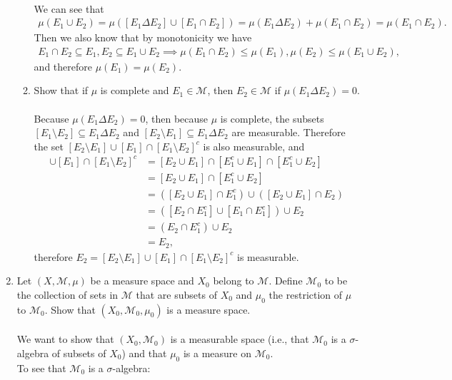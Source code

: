 \begin{enumerate}
\begin{enumerate}[label=(\roman*),align=left]
		\\We can see that
		\begin{align*}
			\mu(E_1\cup E_2)=\mu([E_1\Delta E_2]\cup[E_1\cap E_2])=\mu(E_1\Delta E_2)+\mu(E_1\cap E_2)=\mu(E_1\cap E_2).
		\end{align*}
		Then we also know that by monotonicity we have
		\begin{align*}
			E_1\cap E_2\subseteq E_1,E_2\subseteq E_1\cup E_2\implies\mu(E_1\cap E_2)\le\mu(E_1),\mu(E_2)\le\mu(E_1\cup E_2),
		\end{align*}
		and therefore $\mu(E_1)=\mu(E_2)$.
		\item Show that if $\mu$ is complete and $E_1\in\mathcal{M}$, then $E_2\in\mathcal{M}$ if $\mu(E_1\Delta E_2)=0$.\\
		\\Because $\mu(E_1\Delta E_2)=0$, then because $\mu$ is complete, the subsets $[E_1\setminus E_2]\subseteq E_1\Delta E_2$ and $[E_2\setminus E_1]\subseteq E_1\Delta E_2$ are measurable.
		Therefore the set $[E_2\setminus E_1]\cup[E_1]\cap[E_1\setminus E_2]^c$ is also measurable, and
		\begin{align*}
			[E_2\setminus E_1]\cup[E_1]\cap[E_1\setminus E_2]^c&=[E_2\cup E_1]\cap[E_1^c\cup E_1]\cap[E_1^c\cup E_2]\\
			&=[E_2\cup E_1]\cap[E_1^c\cup E_2]\\
			&=([E_2\cup E_1]\cap E_1^c)\cup ([E_2\cup E_1]\cap E_2)\\
			&=([E_2\cap E_1^c]\cup [E_1\cap E_1^c])\cup E_2\\
			&=(E_2\cap E_1^c)\cup E_2\\
			&=E_2,
		\end{align*}
		therefore $E_2=[E_2\setminus E_1]\cup[E_1]\cap[E_1\setminus E_2]^c$ is measurable.
	\end{enumerate}
	\item Let $(X,\mathcal{M},\mu)$ be a measure space and $X_0$ belong to $\mathcal{M}$.
	Define $\mathcal{M}_0$ to be the collection of sets in $\mathcal{M}$ that are subsets of $X_0$ and $\mu_0$ the restriction of $\mu$ to $\mathcal{M}_0$.
	Show that $(X_0,\mathcal{M}_0,\mu_0)$ is a measure space.\\
	\\We want to show that $(X_0,\mathcal{M}_0)$ is a measurable space (i.e., that $\mathcal{M}_0$ is a $\sigma$-algebra of subsets of $X_0$) and that $\mu_0$ is a measure on $\mathcal{M}_0$.
	\\To see that $\mathcal{M}_0$ is a $\sigma$-algebra:
	\begin{enumerate}[label=(\roman*),align=left]   

\end{enumerate}
\end{enumerate}
